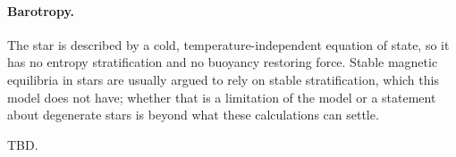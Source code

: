 \documentclass{aa}
\begin{document}
\paragraph{Barotropy.} The star is described by a cold, temperature-independent
equation of state, so it has no entropy stratification and no buoyancy
restoring force. Stable magnetic equilibria in stars are usually argued
to rely on stable stratification, which this model does not have; whether
that is a limitation of the model or a statement about degenerate stars
is beyond what these calculations can settle.

\begin{acknowledgements}
TBD.
\end{acknowledgements}




\end{document}
